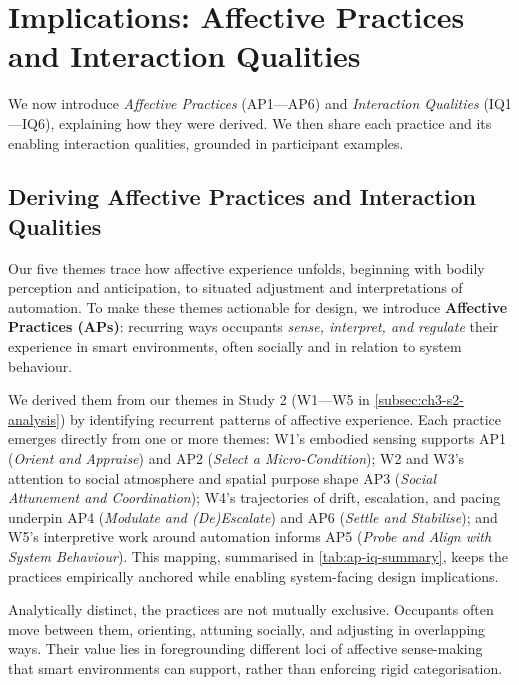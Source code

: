 \section{Implications: Affective Practices and Interaction Qualities}
\label{sec:ch3-higher-order}

We now introduce \textit{Affective Practices} (AP1---AP6) and \textit{Interaction Qualities} (IQ1---IQ6), explaining how they were derived. We then share each practice and its enabling interaction qualities, grounded in participant examples.

\subsection{Deriving Affective Practices and Interaction Qualities}
Our five themes trace how affective experience unfolds, beginning with bodily perception and anticipation, to situated adjustment and interpretations of automation. To make these themes actionable for design, we introduce \textbf{Affective Practices (APs)}: recurring ways occupants \textit{sense, interpret, and regulate} their experience in smart environments, often socially and in relation to system behaviour.

We derived them from our themes in Study 2 (W1---W5 in \autoref{subsec:ch3-s2-analysis}) by identifying recurrent patterns of affective experience. Each practice emerges directly from one or more themes: W1’s embodied sensing supports AP1 (\textit{Orient and Appraise}) and AP2 (\textit{Select a Micro-Condition}); W2 and W3’s attention to social atmosphere and spatial purpose shape AP3 (\textit{Social Attunement and Coordination}); W4’s trajectories of drift, escalation, and pacing underpin AP4 (\textit{Modulate and (De)Escalate}) and AP6 (\textit{Settle and Stabilise}); and W5’s interpretive work around automation informs AP5 (\textit{Probe and Align with System Behaviour}). This mapping, summarised in \autoref{tab:ap-iq-summary}, keeps the practices empirically anchored while enabling system-facing design implications.

Analytically distinct, the practices are not mutually exclusive. Occupants often move between them, orienting, attuning socially, and adjusting in overlapping ways. Their value lies in foregrounding different loci of affective sense-making that smart environments can support, rather than enforcing rigid categorisation.

